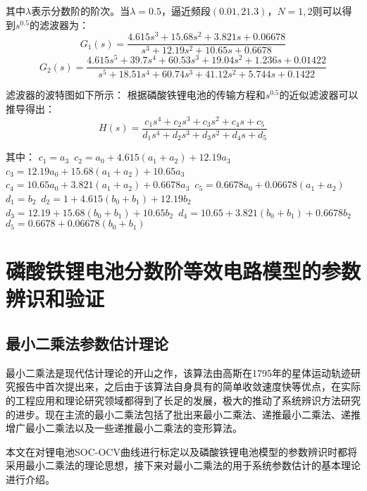 其中$\lambda $表示分数阶的阶次。当$\lambda =0.5$，逼近频段$\left( 0.01,21.3 \right)$，$N=1,2$则可以得到${{s}^{0.5}}$的滤波器为：
\begin{equation}
{{G}_{1}}\left( s \right)=\frac{4.615{{s}^{3}}+15.68{{s}^{2}}+3.821s+0.06678}{{{s}^{3}}+12.19{{s}^{2}}+10.65s+0.6678}
\end{equation}
\begin{equation}
{{G}_{2}}\left( s \right)=\frac{4.615{{s}^{5}}+39.7{{s}^{4}}+60.53{{s}^{3}}+19.04{{s}^{2}}+1.236s+0.01422}{{{s}^{5}}+18.51{{s}^{4}}+60.74{{s}^{3}}+41.12{{s}^{2}}+5.744s+0.1422}
\end{equation}

滤波器的波特图如下所示：
根据磷酸铁锂电池的传输方程和${{s}^{0.5}}$的近似滤波器可以推导得出：
\begin{equation}
H\left( s \right)=\frac{{{c}_{1}}{{s}^{4}}+{{c}_{2}}{{s}^{3}}+{{c}_{3}}{{s}^{2}}+{{c}_{4}}s+{{c}_{5}}}{{{d}_{1}}{{s}^{4}}+{{d}_{2}}{{s}^{3}}+{{d}_{3}}{{s}^{2}}+{{d}_{4}}s+{{d}_{5}}}
\end{equation}

其中：
${{c}_{1}}={{a}_{3}}$~${{c}_{2}}={{a}_{0}}+4.615\left( {{a}_{1}}+{{a}_{2}} \right)+12.19{{a}_{3}}$~${{c}_{3}}=12.19{{a}_{0}}+15.68\left( {{a}_{1}}+{{a}_{2}} \right)+10.65{{a}_{3}}$~${{c}_{4}}=10.65{{a}_{0}}+3.821\left( {{a}_{1}}+{{a}_{2}} \right)+0.6678{{a}_{3}}$~${{c}_{5}}=0.6678{{a}_{0}}+0.06678\left( {{a}_{1}}+{{a}_{2}} \right)$~${{d}_{1}}={{b}_{2}}$~${{d}_{2}}=1+4.615\left( {{b}_{0}}+{{b}_{1}} \right)+12.19{{b}_{2}}$~${{d}_{3}}=12.19+15.68\left( {{b}_{0}}+{{b}_{1}} \right)+10.65{{b}_{2}}$~${{d}_{4}}=10.65+3.821\left( {{b}_{0}}+{{b}_{1}} \right)+0.6678{{b}_{2}}$~${{d}_{5}}=0.6678+0.06678\left( {{b}_{0}}+{{b}_{1}} \right)$
\section{磷酸铁锂电池分数阶等效电路模型的参数辨识和验证}
\subsection{最小二乘法参数估计理论}
最小二乘法是现代估计理论的开山之作，该算法由高斯在1795年的星体运动轨迹研究报告中首次提出来，之后由于该算法自身具有的简单收敛速度快等优点，在实际的工程应用和理论研究领域都得到了长足的发展，极大的推动了系统辨识方法研究的进步。现在主流的最小二乘法包括了批出来最小二乘法、递推最小二乘法、递推增广最小二乘法以及一些递推最小二乘法的变形算法。

本文在对锂电池SOC-OCV曲线进行标定以及磷酸铁锂电池模型的参数辨识时都将采用最小二乘法的理论思想，接下来对最小二乘法的用于系统参数估计的基本理论进行介绍。

